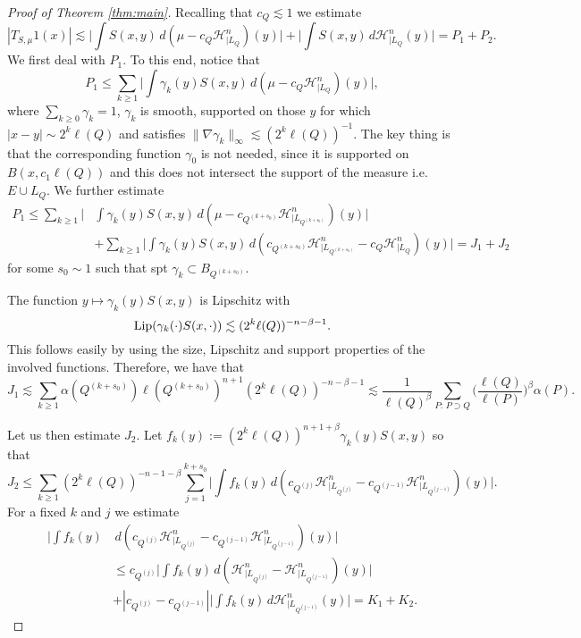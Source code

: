 \documentclass[11pt,a4paper,leqno]{amsart}
\numberwithin{equation}{section}
\theoremstyle{plain}
\theoremstyle{definition}
\theoremstyle{remark}
\begin{document}
\begin{proof}[Proof of Theorem \ref{thm:main}]
Recalling that $c_Q \lesssim 1$ we estimate
\begin{displaymath}
|T_{S,\mu}1(x)| \lesssim \Big| \int S(x,y)\,d(\mu - c_Q \mathcal{H}^n_{\mid L_Q})(y)\Big | + \Big| \int S(x,y)\,d\mathcal{H}^n_{\mid L_Q}(y)\Big | = P_1 + P_2.
\end{displaymath}
We first deal with $P_1$. To this end, notice that
\begin{displaymath}
P_1 \le \sum_{k \ge 1} \Big| \int \gamma_k(y) S(x,y)\,d(\mu - c_Q \mathcal{H}^n_{\mid L_Q})(y)\Big |,
\end{displaymath}
where $\sum_{k \ge 0} \gamma_k = 1$, $\gamma_k$ is smooth, supported on those $y$ for which $|x-y| \sim 2^k \ell(Q)$ and satisfies $\|\nabla \gamma_k \|_{\infty} \lesssim (2^k\ell(Q))^{-1}$.
The key thing is that the corresponding function $\gamma_0$ is not needed, since it is supported on $B(x, c_1\ell(Q))$ and this does not intersect the support of the measure i.e. $E \cup L_Q$.
We further estimate
\begin{align*}
P_1 \le \sum_{k \ge 1} \Big|& \int \gamma_k(y) S(x,y)\,d(\mu - c_{Q^{(k+s_0)}} \mathcal{H}^n_{\mid L_{Q^{(k+s_0)}}})(y)\Big | \\
&+ \sum_{k \ge 1} \Big| \int \gamma_k(y) S(x,y)\,d(c_{Q^{(k+s_0)}} \mathcal{H}^n_{\mid L_{Q^{(k+s_0)}}} - c_Q \mathcal{H}^n_{\mid L_Q})(y)\Big | = J_1 + J_2
\end{align*}
for some $s_0 \sim 1$ such that spt $\gamma_k \subset B_{Q^{(k+s_0)}}$.

The function $y \mapsto \gamma_k(y) S(x,y)$ is Lipschitz with
\begin{displaymath}
\textup{Lip}( \gamma_k(\cdot) S(x,\cdot)) \lesssim (2^k\ell(Q))^{-n-\beta-1}.
\end{displaymath}
This follows easily by using the size, Lipschitz and support properties of the involved functions.
Therefore, we have that
\begin{displaymath}
J_1 \lesssim \sum_{k \ge 1} \alpha(Q^{(k+s_0)}) \ell(Q^{(k+s_0)})^{n+1}(2^k\ell(Q))^{-n-\beta-1} \lesssim \frac{1}{\ell(Q)^{\beta}} \sum_{P:\,P \supset Q} \Big( \frac{\ell(Q)}{\ell(P)} \Big)^{\beta} \alpha(P).
\end{displaymath}

Let us then estimate $J_2$. Let $f_k(y) := (2^k\ell(Q))^{n+1+\beta}\gamma_k(y)S(x,y)$ so that
\begin{displaymath}
J_2 \le \sum_{k \ge 1} (2^k\ell(Q))^{-n-1-\beta} \sum_{j=1}^{k + s_0} \Big| \int f_k(y)\,d(c_{Q^{(j)}} \mathcal{H}^n_{\mid L_{Q^{(j)}}} - c_{Q^{(j-1)}} \mathcal{H}^n_{\mid L_{Q^{(j-1)}}})(y)\Big |.
\end{displaymath}
For a fixed $k$ and $j$ we estimate
\begin{align*}
\Big| \int f_k(y)&\,d(c_{Q^{(j)}} \mathcal{H}^n_{\mid L_{Q^{(j)}}} - c_{Q^{(j-1)}} \mathcal{H}^n_{\mid L_{Q^{(j-1)}}})(y)\Big |\\ 
&\le c_{Q^{(j)}} \Big| \int f_k(y)\,d(\mathcal{H}^n_{\mid L_{Q^{(j)}}} - \mathcal{H}^n_{\mid L_{Q^{(j-1)}}})(y)\Big| \\
&+ |c_{Q^{(j)}} -c_{Q^{(j-1)}}| \Big| \int f_k(y)\, d\mathcal{H}^n_{\mid L_{Q^{(j-1)}}}(y)\Big | = K_1 + K_2.
\end{align*}


\end{proof}
\end{document}

